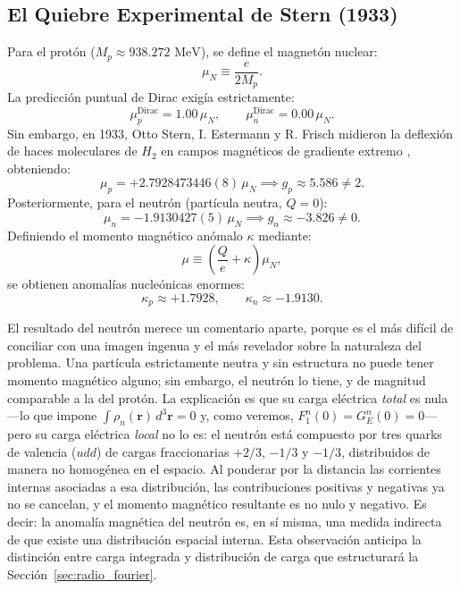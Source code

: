 \documentclass[10pt,a4paper]{article}
\begin{document}
\subsection{El Quiebre Experimental de Stern (1933)}
Para el protón ($M_p \approx 938.272\text{ MeV}$), se define el magnetón nuclear:
\begin{equation}
\mu_N \equiv \frac{e}{2M_p}.
\end{equation}
La predicción puntual de Dirac exigía estrictamente:
\begin{equation}
\mu_p^{\text{Dirac}} = 1.00\,\mu_N, \qquad \mu_n^{\text{Dirac}} = 0.00\,\mu_N.
\end{equation}
Sin embargo, en 1933, Otto Stern, I. Estermann y R. Frisch midieron la deflexión de haces moleculares de $H_2$ en campos magnéticos de gradiente extremo \cite{stern1933,griffiths2008}, obteniendo:
\begin{equation}
\mu_p = +2.7928473446(8)\,\mu_N \implies g_p \approx 5.586 \neq 2.
\end{equation}
Posteriormente, para el neutrón (partícula neutra, $Q=0$):
\begin{equation}
\mu_n = -1.9130427(5)\,\mu_N \implies g_n \approx -3.826 \neq 0.
\end{equation}
Definiendo el momento magnético anómalo $\kappa$ mediante:
\begin{equation}
\mu \equiv \left( \frac{Q}{e} + \kappa \right) \mu_N,
\end{equation}
se obtienen anomalías nucleónicas enormes:
\begin{equation}
\kappa_p \approx +1.7928, \qquad \kappa_n \approx -1.9130.
\end{equation}

El resultado del neutrón merece un comentario aparte, porque es el más difícil de conciliar con una imagen ingenua y el más revelador sobre la naturaleza del problema. Una partícula estrictamente neutra y sin estructura no puede tener momento magnético alguno; sin embargo, el neutrón lo tiene, y de magnitud comparable a la del protón. La explicación es que su carga eléctrica \emph{total} es nula---lo que impone $\int \rho_n(\mathbf{r})\,d^3\mathbf{r} = 0$ y, como veremos, $F_1^n(0) = G_E^n(0) = 0$---pero su carga eléctrica \emph{local} no lo es: el neutrón está compuesto por tres quarks de valencia ($udd$) de cargas fraccionarias $+2/3$, $-1/3$ y $-1/3$, distribuidos de manera no homogénea en el espacio. Al ponderar por la distancia las corrientes internas asociadas a esa distribución, las contribuciones positivas y negativas ya no se cancelan, y el momento magnético resultante es no nulo y negativo. Es decir: la anomalía magnética del neutrón es, en sí misma, una medida indirecta de que existe una distribución espacial interna. Esta observación anticipa la distinción entre carga integrada y distribución de carga que estructurará la Sección~\ref{sec:radio_fourier}.
\end{document}
